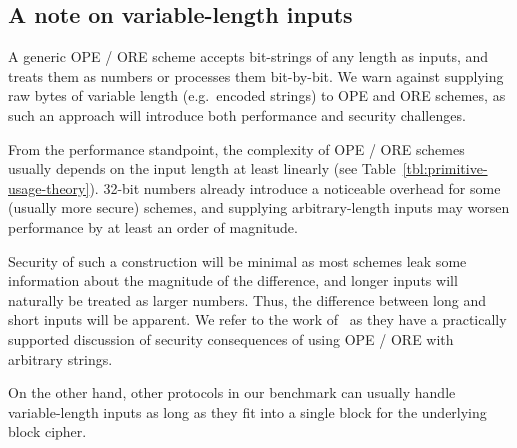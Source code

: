 	\subsection{A note on variable-length inputs}\label{sec:variable-inputs}

		A generic OPE / ORE scheme accepts bit-strings of any length as inputs, and treats them as numbers or processes them bit-by-bit.
		We warn against supplying raw bytes of variable length (e.g.\ encoded strings) to OPE and ORE schemes, as such an approach will introduce both performance and security challenges.

		From the performance standpoint, the complexity of OPE / ORE schemes usually depends on the input length at least linearly (see Table~\ref{tbl:primitive-usage-theory}).
		32-bit numbers already introduce a noticeable overhead for some (usually more secure) schemes, and supplying arbitrary-length inputs may worsen performance by at least an order of magnitude.

		Security of such a construction will be minimal as most schemes leak some information about the magnitude of the difference, and longer inputs will naturally be treated as larger numbers.
		Thus, the difference between long and short inputs will be apparent.
		We refer to the work of~\textcite{leakage-abuse-grubs-2017} as they have a practically supported discussion of security consequences of using OPE / ORE with arbitrary strings.

		On the other hand, other protocols in our benchmark can usually handle variable-length inputs as long as they fit into a single block for the underlying block cipher.
